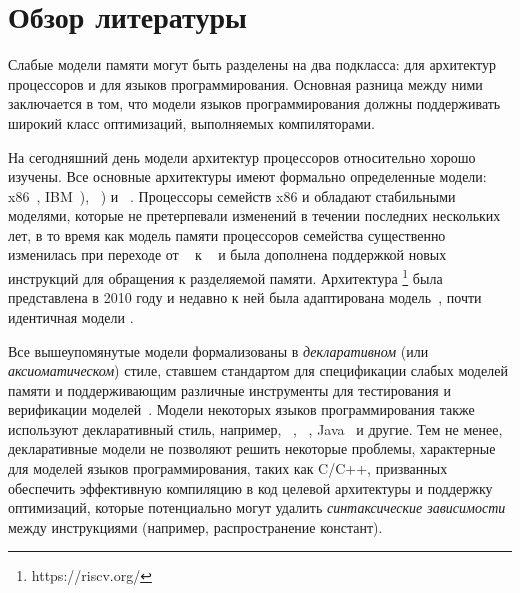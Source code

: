 \section{Обзор литературы}
\label{sec:related}

Слабые модели памяти могут быть разделены на два подкласса:
для архитектур процессоров и  для языков программирования.
Основная разница между ними заключается в том, что  модели языков программирования
должны поддерживать широкий класс оптимизаций, выполняемых компиляторами. 

На сегодняшний день модели архитектур процессоров относительно хорошо изучены. 
Все основные архитектуры имеют формально определенные модели:
x86~\cite{Sewell-al:CACM10}, IBM~\POWER \cite{Alglave-DAMP09,Sarkar-al:PLDI11,Alglave-al:TOPLAS14}),
\ARM~\cite{Chong-ASPLOS08, Alglave-DAMP09,Pulte-al:POPL18,Flur-al:POPL16,Alglave-al:TOPLAS14})
и \RISC~\cite{Pulte-al:POPL18}.
Процессоры семейств x86 и \POWER обладают стабильными моделями, 
которые не претерпевали изменений в течении последних нескольких лет, 
в то время как модель памяти процессоров семейства \ARM 
существенно изменилась при переходе от ~\cite{Alglave-al:TOPLAS14} 
к ~\cite{Pulte-al:POPL18}
и была дополнена поддержкой новых инструкций для обращения к разделяемой памяти.
Архитектура \RISC\footnote{https://riscv.org/} была представлена в 2010 году 
и недавно к ней была адаптирована модель~\cite{Pulte-al:POPL18}, 
почти идентичная модели .

Все вышеупомянутые модели формализованы в \emph{декларативном} 
(или \emph{аксиоматическом}) стиле, 
ставшем стандартом для спецификации слабых моделей памяти и 
поддерживающим различные инструменты для 
тестирования и верификации моделей~\cite{Alglave-al:TOPLAS14}.
Модели некоторых языков программирования также используют декларативный стиль, например,
\CPP~\cite{Batty-al:POPL11}, \JS~\cite{Watt-al:PLDI2020}, Java~\cite{Manson-al:POPL05} и другие.
Тем не менее, декларативные модели не позволяют решить некоторые проблемы, 
характерные для моделей языков программирования, таких как C/C++, 
призванных обеспечить эффективную компиляцию в код целевой архитектуры и 
поддержку оптимизаций, которые потенциально могут удалить 
\emph{синтаксические зависимости} между инструкциями 
(например, распространение констант). 

